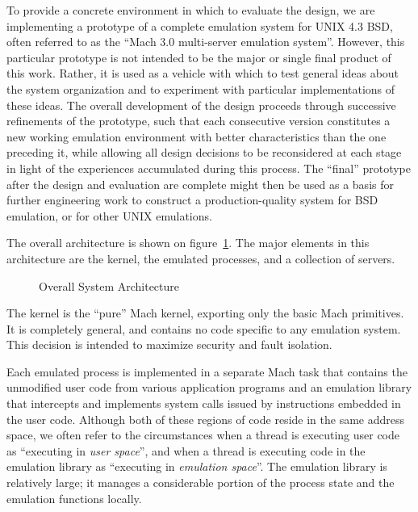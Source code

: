 To provide a concrete environment in which to evaluate the design, we
are implementing a prototype of a complete emulation system for UNIX
4.3 BSD, often referred to as the ``Mach 3.0 multi-server emulation
system''. However, this particular prototype is not intended to be the
major or single final product of this work. Rather, it is used as a
vehicle with which to test general ideas about the system organization
and to experiment with particular implementations of these ideas. The
overall development of the design proceeds through successive
refinements of the prototype, such that each consecutive version
constitutes a new working emulation environment with better
characteristics than the one preceding it, while allowing all design
decisions to be reconsidered at each stage in light of the experiences
accumulated during this process. The ``final'' prototype after the
design and evaluation are complete might then be used as a basis for
further engineering work to construct a production-quality system for
BSD emulation, or for other UNIX emulations.

The overall architecture is shown on figure~\ref{fig:architecture}.
The major elements in this architecture are the kernel, the emulated
processes, and a collection of servers.

\begin{figure}[hbt]
\vspace{12cm}
\caption{Overall System Architecture}
\label{fig:architecture}
\end{figure}

The kernel is the ``pure'' Mach kernel, exporting only the basic Mach
primitives. It is completely general, and contains no code specific to
any emulation system. This decision is intended to maximize security
and fault isolation.

Each emulated process is implemented in a separate Mach task that
contains the unmodified user code from various application programs
and an emulation library that intercepts and implements system calls
issued by instructions embedded in the user code.  Although both of
these regions of code reside in the same address space, we often refer
to the circumstances when a thread is executing user code as
``executing in {\em user space}'', and when a thread is executing code
in the emulation library as ``executing in {\em emulation space}''.
The emulation library is relatively large; it manages a considerable
portion of the process state and the emulation functions locally.

